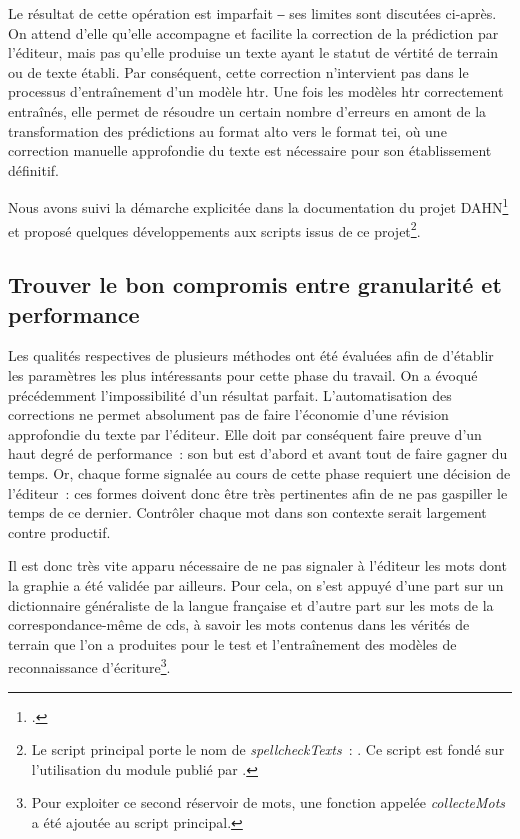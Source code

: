 \documentclass[a4paper,12pt,twoside]{book}
\begin{document}
			Le résultat de cette opération est imparfait ‒ ses limites sont discutées ci-après. On attend d'elle qu'elle accompagne et facilite la correction de la prédiction par l'éditeur, mais pas qu'elle produise un texte ayant le statut de vértité de terrain ou de texte établi. Par conséquent, cette correction n'intervient pas dans le processus d'entraînement d'un modèle \gls{htr}. Une fois les modèles \gls{htr} correctement entraînés, elle permet de résoudre un certain nombre d'erreurs en amont de la transformation des prédictions au format \gls{alto} vers le format \gls{tei}, où une correction manuelle approfondie du texte est nécessaire pour son établissement définitif.
			
			Nous avons suivi la démarche explicitée dans la documentation du projet DAHN\footcite{chiffoleauHowPostOCRCorrection2022} et proposé quelques développements aux scripts issus de ce projet\footnote{Le script principal porte le nom de \textit{spellcheckTexts}~: \cite{biaySpellcheckTextsPy2022}. Ce script est fondé sur l'utilisation du module publié par \cite{barrusPyspellcheckerPurePython}.}.
					
			\subsection{Trouver le bon compromis entre granularité et performance}
				Les qualités respectives de plusieurs méthodes ont été évaluées afin de d'établir les paramètres les plus intéressants pour cette phase du travail. On a évoqué précédemment l'impossibilité d'un résultat parfait. L'automatisation des corrections ne permet absolument pas de faire l'économie d'une révision approfondie du texte par l'éditeur. Elle doit par conséquent faire preuve d'un haut degré de performance~: son but est d'abord et avant tout de faire gagner du temps. Or, chaque forme signalée au cours de cette phase requiert une décision de l'éditeur~: ces formes doivent donc être très pertinentes afin de ne pas gaspiller le temps de ce dernier. Contrôler chaque mot dans son contexte serait largement contre productif.
				
				Il est donc très vite apparu nécessaire de ne pas signaler à l'éditeur les mots dont la graphie a été validée par ailleurs. Pour cela, on s'est appuyé d'une part sur un dictionnaire généraliste de la langue française et d'autre part sur les mots de la correspondance-même de \gls{cds}, à savoir les mots contenus dans les vérités de terrain que l'on a produites pour le test et l'entraînement des modèles de reconnaissance d'écriture\footnote{Pour exploiter ce second réservoir de mots, une fonction appelée \textit{collecteMots} a été ajoutée au script principal.}.
			
\end{document}
